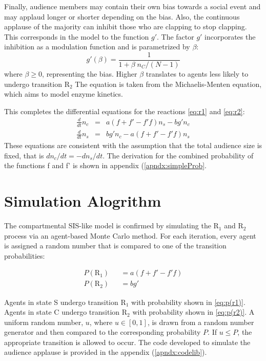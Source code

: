Finally, audience members may contain their own bias towards a social event and may applaud longer or shorter depending on the bias.
Also, the continuous applause of the majority can inhibit those who are clapping to stop clapping.
This corresponds in the model to the function $g'$.
The factor $g'$ incorporates the inhibition as a modulation function and is parametrized by $\beta$: 
\begin{equation}\label{eq:g'}
  g'(\beta) = \frac{1}{1 + \beta\;n_C /(N-1)}
\end{equation}
where $\beta \geq 0$, representing the bias.
Higher $\beta$ translates to agents less likely to undergo transition $\mathrm{R}_{2}$ 
The equation is taken from the Michaelis-Menten equation, which aims to model enzyme kinetics\cite{michaelisconstant}.

This completes the differential equations for the reactions \eqref{eq:r1} and \eqref{eq:r2}:
\begin{eqnarray}
\frac{d}{dt}n_{c} &=& a (f+f'-f'f) n_{s} - b g' n_{c}\label{eq:diff1} \\
\frac{d}{dt}n_{s} &=& b g' n_{c} - a (f+f'-f'f) n_{s}\label{eq:diff2}
\end{eqnarray}
These equations are consistent with the assumption that the total audience size is fixed, that is $dn_{c}/dt = -dn_{s}/dt$.
The derivation for the combined probability of the functions f and f' is shown in appendix (\ref{apndx:simpleProb}.



\section{Simulation Alogrithm}
\hspace{\parindent} The compartmental SIS-like model is confirmed by simulating the $\mathrm{R}_{1}$ and $\mathrm{R}_{2}$ process via an agent-based Monte Carlo method. For each iteration, every agent is assigned a random number that is compared to one of the transition probabilities:

\begin{eqnarray}
P(\mathrm{R}_{1}) &&= a(f + f' - f'f) \label{eq:p(r1)} \\
P(\mathrm{R}_{2}) &&= bg' \label{eq:p(r2)}
\end{eqnarray}

Agents in state S undergo transition $\mathrm{R}_{1}$ with probability shown in \ref{eq:p(r1)}.
Agents in state C undergo transition $\mathrm{R}_{2}$ with probability shown in \ref{eq:p(r2)}.
A uniform random number, $u$, where $u \in [0,1]$, is drawn from a random number generator and then compared to the corresponding probability $P$.
If $u \leq P$, the appropriate transition is allowed to occur.
The code developed to simulate the audience applause is provided in the appendix (\ref{apndx:codelib}).


